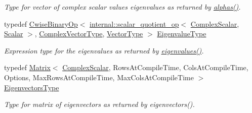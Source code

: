 \begin{DoxyCompactItemize}
\begin{DoxyCompactList}\small\item\em Type for vector of complex scalar values eigenvalues as returned by \hyperlink{group___eigenvalues___module_a82b1bc41267f46e5c5899d5b084a73bb}{alphas()}. \end{DoxyCompactList}\item 
\mbox{\label{group___eigenvalues___module_ad59af178acc401f1bc4e330ef80f286d}} 
typedef \hyperlink{group___core___module_class_eigen_1_1_cwise_binary_op}{Cwise\+Binary\+Op}$<$ \hyperlink{struct_eigen_1_1internal_1_1scalar__quotient__op}{internal\+::scalar\+\_\+quotient\+\_\+op}$<$ \hyperlink{group___eigenvalues___module_abdec07af91db1345bb4c74066e3d0ea7}{Complex\+Scalar}, \hyperlink{group___eigenvalues___module_afb318d0b097ff8dd5a7410d31317ca47}{Scalar} $>$, \hyperlink{group___eigenvalues___module_acfd144329aca76882069da2fc5d53ef5}{Complex\+Vector\+Type}, \hyperlink{group___eigenvalues___module_a5aa3d1390c2b0d455c1c9b8b3101b119}{Vector\+Type} $>$ \hyperlink{group___eigenvalues___module_ad59af178acc401f1bc4e330ef80f286d}{Eigenvalue\+Type}
\begin{DoxyCompactList}\small\item\em Expression type for the eigenvalues as returned by \hyperlink{group___eigenvalues___module_a62f01cd78271efd5e39bcb24e0fe1a58}{eigenvalues()}. \end{DoxyCompactList}\item 
typedef \hyperlink{group___core___module_class_eigen_1_1_matrix}{Matrix}$<$ \hyperlink{group___eigenvalues___module_abdec07af91db1345bb4c74066e3d0ea7}{Complex\+Scalar}, Rows\+At\+Compile\+Time, Cols\+At\+Compile\+Time, Options, Max\+Rows\+At\+Compile\+Time, Max\+Cols\+At\+Compile\+Time $>$ \hyperlink{group___eigenvalues___module_afffec018dbb2d87b4c09b6acecbb79cd}{Eigenvectors\+Type}
\begin{DoxyCompactList}\small\item\em Type for matrix of eigenvectors as returned by eigenvectors(). \end{DoxyCompactList}\end{DoxyCompactItemize}
